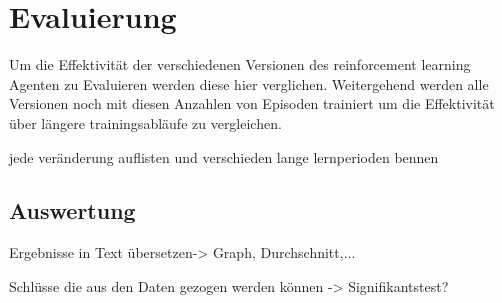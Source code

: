 \chapter{Evaluierung}%

\label{cha:Eval}

Um die Effektivität der verschiedenen Versionen des reinforcement learning Agenten zu Evaluieren werden diese hier verglichen. Weitergehend werden alle Versionen noch mit diesen Anzahlen von Episoden trainiert um die Effektivität über längere trainingsabläufe zu vergleichen.

\colorbox{red!30}{jede veränderung auflisten und verschieden lange lernperioden bennen}


\section{Auswertung}
\colorbox{red!30}{Ergebnisse in Text übersetzen-> Graph, Durchschnitt,...}

\colorbox{red!30}{Schlüsse die aus den Daten gezogen werden können -> Signifikantstest?}




